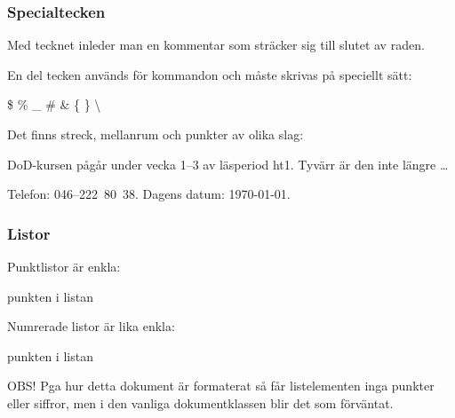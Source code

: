 \begin{frame}[fragile=singleslide]
  \frametitle{Specialtecken}
  Med tecknet \code{\%} inleder man en kommentar som sträcker sig till slutet av raden.

  \blankline
  En del tecken används för kommandon och måste skrivas på speciellt sätt:

  \begin{Code}
    \$ \% \_ \# \& \{ \} \textbackslash
  \end{Code}

  Det finns streck, mellanrum och punkter av olika slag:

  \begin{exempel}
    DoD-kursen pågår under vecka
    1--3 av läsperiod ht1. Tyvärr
    är den inte längre \ldots

    \quad Telefon: 046--222~80~38.
    Dagens datum: \today.
  \end{exempel}
\end{frame}


\begin{frame}[fragile=singleslide]
  \frametitle{Listor}
  Punktlistor är enkla:

  \begin{exempel}
    \begin{itemize}
            punkten i listan
    \end{itemize}
  \end{exempel}

  Numrerade listor är lika enkla:

  \begin{exempel}
    \begin{enumerate}
            punkten i listan
    \end{enumerate}
  \end{exempel}

  OBS! Pga hur detta dokument är formaterat så får listelementen inga punkter eller siffror, men i den vanliga dokumentklassen  blir det som förväntat.
\end{frame}

